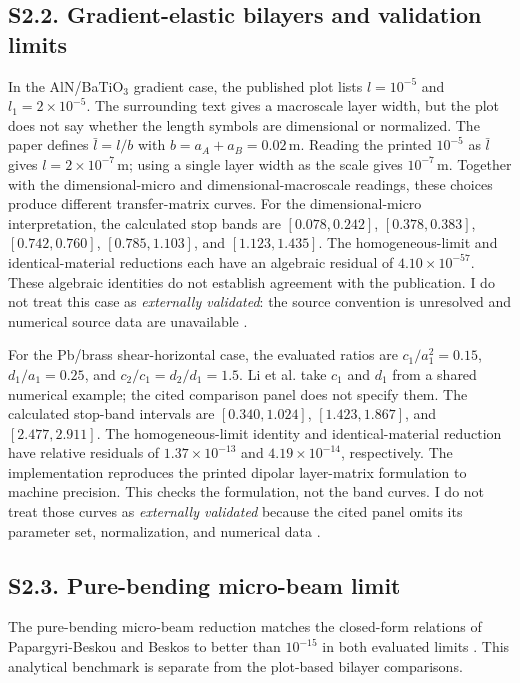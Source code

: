 \documentclass[pdflatex,sn-basic,Numbered]{sn-jnl}
\begin{document}
\subsection*{S2.2. Gradient-elastic bilayers and validation limits}
In the AlN/BaTiO$_3$ gradient case, the published plot lists $l=10^{-5}$ and $l_1=2\times10^{-5}$. The surrounding text gives a macroscale layer width, but the plot does not say whether the length symbols are dimensional or normalized. The paper defines $\bar l=l/b$ with $b=a_A+a_B=0.02\,\mathrm{m}$. Reading the printed $10^{-5}$ as $\bar l$ gives $l=2\times10^{-7}\,\mathrm{m}$; using a single layer width as the scale gives $10^{-7}\,\mathrm{m}$. Together with the dimensional-micro and dimensional-macroscale readings, these choices produce different transfer-matrix curves. For the dimensional-micro interpretation, the calculated stop bands are $[0.078,0.242]$, $[0.378,0.383]$, $[0.742,0.760]$, $[0.785,1.103]$, and $[1.123,1.435]$. The homogeneous-limit and identical-material reductions each have an algebraic residual of $4.10\times10^{-57}$. These algebraic identities do not establish agreement with the publication. I do not treat this case as \emph{externally validated}: the source convention is unresolved and numerical source data are unavailable \cite{li2024anchorB}.

For the Pb/brass shear-horizontal case, the evaluated ratios are $c_1/a_1^2=0.15$, $d_1/a_1=0.25$, and $c_2/c_1=d_2/d_1=1.5$. Li et al. take $c_1$ and $d_1$ from a shared numerical example; the cited comparison panel does not specify them. The calculated stop-band intervals are $[0.340,1.024]$, $[1.423,1.867]$, and $[2.477,2.911]$. The homogeneous-limit identity and identical-material reduction have relative residuals of $1.37\times10^{-13}$ and $4.19\times10^{-14}$, respectively. The implementation reproduces the printed dipolar layer-matrix formulation to machine precision. This checks the formulation, not the band curves. I do not treat those curves as \emph{externally validated} because the cited panel omits its parameter set, normalization, and numerical data \cite{li2023anchorA,liweizhou2016}.

\subsection*{S2.3. Pure-bending micro-beam limit}
The pure-bending micro-beam reduction matches the closed-form relations of Papargyri-Beskou and Beskos to better than $10^{-15}$ in both evaluated limits \cite{papargyribeskou2009}. This analytical benchmark is separate from the plot-based bilayer comparisons.
\end{document}

